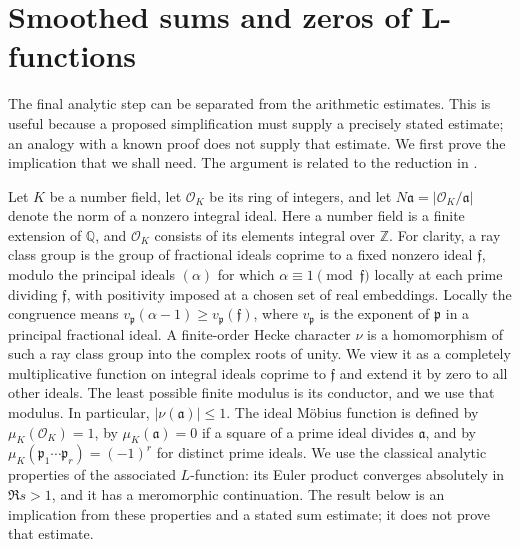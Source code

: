 
\section{Smoothed sums and zeros of L-functions}
\label{qr-sec-mellin}

The final analytic step can be separated from the arithmetic estimates.
This is useful because a proposed simplification must supply a precisely
stated estimate; an analogy with a known proof does not supply that estimate.
We first prove the implication that we shall need. The argument is related
to the reduction in \cite[Section~3]{OpenAIOctober}.

Let $K$ be a number field, let $\mathcal O_K$ be its ring of integers,
and let $N\mathfrak a=|\mathcal O_K/\mathfrak a|$ denote the norm of a
nonzero integral ideal. Here a number field is a finite extension of $\mathbb Q$, and
$\mathcal O_K$ consists of its elements integral over $\mathbb Z$.
For clarity, a ray class group is the group of fractional ideals
coprime to a fixed nonzero ideal $\mathfrak f$, modulo the principal
ideals $(\alpha)$ for which $\alpha\equiv1\pmod{\mathfrak f}$
locally at each prime dividing $\mathfrak f$, with positivity imposed
at a chosen set of real embeddings. Locally the congruence means
$v_{\mathfrak p}(\alpha-1)\geq v_{\mathfrak p}(\mathfrak f)$,
where $v_{\mathfrak p}$ is the exponent of $\mathfrak p$ in a
principal fractional ideal.
A finite-order Hecke character $\nu$ is a homomorphism of such a
ray class group into the complex roots of unity. We view it as a
completely multiplicative function on integral ideals coprime to
$\mathfrak f$ and extend it by zero to all other ideals. The least
possible finite modulus is its conductor, and we use that modulus.
In particular, $|\nu(\mathfrak a)|\leq1$. The ideal M\"obius function is
defined by $\mu_K(\mathcal O_K)=1$, by $\mu_K(\mathfrak a)=0$ if a square
of a prime ideal divides $\mathfrak a$, and by
$\mu_K(\mathfrak p_1\cdots\mathfrak p_r)=(-1)^r$ for distinct prime ideals.
We use the classical analytic properties of the associated $L$-function:
its Euler product converges absolutely in $\Re s>1$, and it has a
meromorphic continuation. The result below is an implication from these
properties and a stated sum estimate; it does not prove that estimate.

